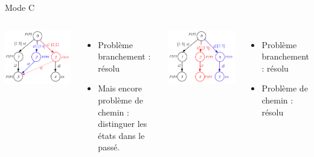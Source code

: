 \documentclass[compress]{beamer}
\begin{document}
\begin{frame}{Mode C}%
\begin{columns}
	\centerline{\includegraphics[width=.8\linewidth]{graph_a}}
	\begin{itemize}
	\item Problème branchement : résolu
	\item Mais encore problème de chemin : distinguer les états dans le passé.
	\end{itemize}
	\centerline{\includegraphics[width=.8\linewidth]{graph_c}}
	\begin{itemize}
	\item Problème branchement : résolu
	\item Problème de chemin : résolu
	\end{itemize}
\end{columns}
\end{frame}
\end{document}
